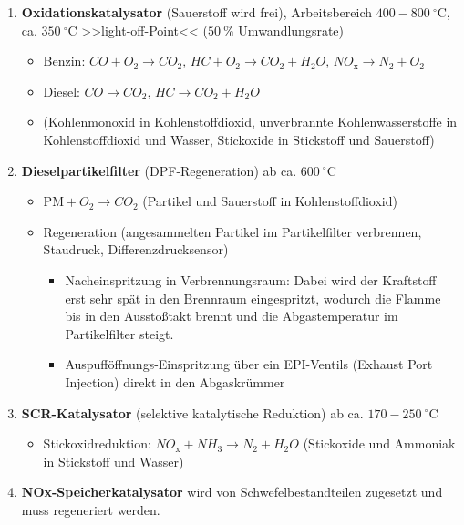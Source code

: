 \begin{enumerate}
\item
  \textbf{Oxidationskatalysator} (Sauerstoff wird frei), Arbeitsbereich
  $400 - 800~^\circ\text{C}$, ca. $350~^\circ\text{C}$
  >>light-off-Point<< ($50~\%$ Umwandlungsrate)

  \begin{itemize}
  \item
    Benzin: $CO + O_2 \to CO_2$, $HC + O_2 \to CO_2 + H_{2}O$,
    $NO_\text{x} \to N_2 + O_2$
  \item
    Diesel: $CO \to CO_2$, $HC \to CO_2 + H_{2}O$
  \item
    (Kohlenmonoxid in Kohlenstoffdioxid, unverbrannte Kohlenwasserstoffe
    in Kohlenstoffdioxid und Wasser, Stickoxide in Stickstoff und
    Sauerstoff)
  \end{itemize}
\item
  \textbf{Dieselpartikelfilter} (DPF-Regeneration) ab ca.
  $600~^\circ\text{C}$

  \begin{itemize}
  \item
    $\text{PM} + O_2 \to CO_{2}$ (Partikel und Sauerstoff in
    Kohlenstoffdioxid)
  \item
    Regeneration (angesammelten Partikel im Partikelfilter verbrennen,
    Staudruck, Differenzdrucksensor)

    \begin{itemize}
    \item
      Nacheinspritzung in Verbrennungsraum: Dabei wird der Kraftstoff
      erst sehr spät in den Brennraum eingespritzt, wodurch die Flamme
      bis in den Ausstoßtakt brennt und die Abgastemperatur im
      Partikelfilter steigt.
    \item
      Auspufföffnungs-Einspritzung über ein EPI-Ventils (Exhaust Port
      Injection) direkt in den Abgaskrümmer
    \end{itemize}
  \end{itemize}
\item
  \textbf{SCR-Katalysator} (selektive katalytische Reduktion) ab ca.
  $170 - 250~^\circ\text{C}$

  \begin{itemize}
  \item
    Stickoxidreduktion: $NO_\text{x} + NH_\text{3} \to N_2 + H_{2}O$
    (Stickoxide und Ammoniak in Stickstoff und Wasser)
  \end{itemize}
\item
  \textbf{NOx-Speicherkatalysator} wird von Schwefelbestandteilen
  zugesetzt und muss regeneriert werden.
\end{enumerate}

